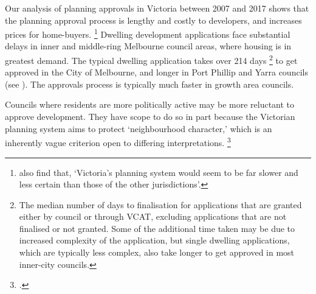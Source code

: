 \clearpage
	\begin{boxshell}
	\begin{leftfullpage}
	  \begin{mdframed}[style=GrattanFrameBoxA]
		  \addtolength{\columnsep}{-23.8pt}%
		  \begin{multicols}{2}
			  \setlength{\parskip}{4pt plus 1pt minus 1pt}
			  \RaggedRight
				Our analysis of planning approvals in Victoria between 2007 and 2017 shows that the planning approval process is lengthy and costly to developers, and increases prices for home-buyers.%
				  \footnote{\textcite[][402]{Gurran_Phibbs_2013_housing_supply} also find that, `Victoria’s planning system would seem to be far slower and less certain than those of the other jurisdictions'.}
				Dwelling development applications face substantial delays in inner and middle-ring Melbourne council areas, where housing is in greatest demand.
				The typical dwelling application takes over 214 days%
				  \footnote{The median number of days to finalisation for applications that are granted
				  either by council or through VCAT, excluding applications that are not finalised or not granted.
				  Some of the additional time taken may be due to increased complexity of the application, but
				  single dwelling applications, which are typically less complex, also take longer to get approved in most inner-city councils.}
				to get approved in the City of Melbourne, and longer in Port Phillip and Yarra councils (see ).
				The approvals process is typically much faster in growth area councils.


				Councils where residents are more politically active may be more reluctant to approve development. They have scope to do so in part because the Victorian planning system aims to protect `neighbourhood character,' which is an inherently vague criterion open to differing interpretations.%
				    \footcites{VICDepLWP2017Neighbour}[][64, 72, 91]{Rowley_2017_Vic_planning_system}


\end{multicols}
\end{mdframed}
\end{leftfullpage}
\end{boxshell}
